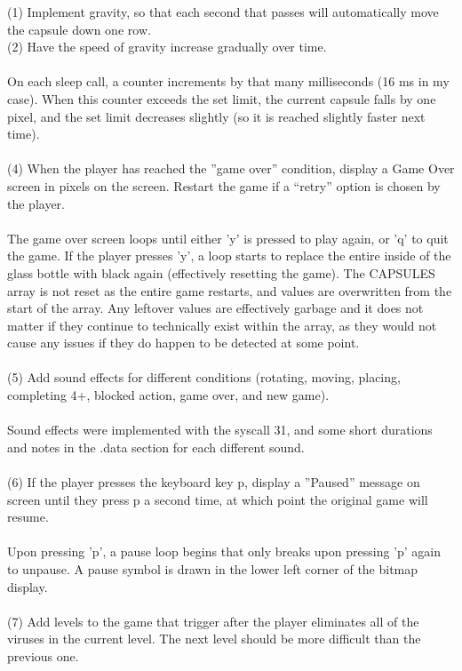 \documentclass{article}
\begin{document}
(1) Implement gravity, so that each second that passes will automatically move the capsule down one row.\\
(2) Have the speed of gravity increase gradually over time.\\\\
On each sleep call, a counter increments by that many milliseconds (16 ms in my case). When this counter exceeds the set limit, the current capsule falls by one pixel, and the set limit decreases slightly (so it is reached slightly faster next time).\\\\
(4) When the player has reached the ”game over” condition, display a Game Over screen in pixels on the screen. Restart the game if a “retry” option is chosen by the player.\\\\
The game over screen loops until either 'y' is pressed to play again, or 'q' to quit the game. If the player presses 'y', a loop starts to replace the entire inside of the glass bottle with black again (effectively resetting the game). The CAPSULES array is not reset as the entire game restarts, and values are overwritten from the start of the array. Any leftover values are effectively garbage and it does not matter if they continue to technically exist within the array, as they would not cause any issues if they do happen to be detected at some point.\\\\
(5) Add sound effects for different conditions (rotating, moving, placing, completing 4+, blocked action, game over, and new game).\\\\
Sound effects were implemented with the syscall 31, and some short durations and notes in the .data section for each different sound.\\\\
(6) If the player presses the keyboard key p, display a ”Paused” message on screen until they press p a second time, at which point the original game will resume.\\\\
Upon pressing 'p', a pause loop begins that only breaks upon pressing 'p' again to unpause. A pause symbol is drawn in the lower left corner of the bitmap display.\\\\
(7) Add levels to the game that trigger after the player eliminates all of the viruses in the current level. The next level should be more difficult than the previous one.\\\\
\end{document}
